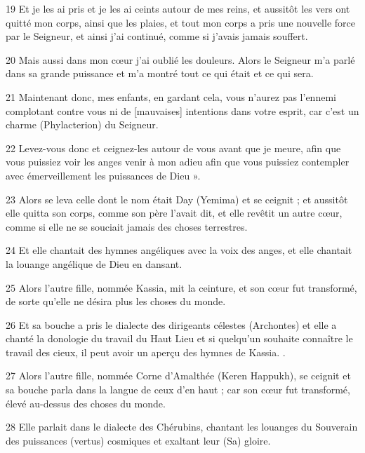 \par 19 Et je les ai pris et je les ai ceints autour de mes reins, et aussitôt les vers ont quitté mon corps, ainsi que les plaies, et tout mon corps a pris une nouvelle force par le Seigneur, et ainsi j'ai continué, comme si j'avais jamais souffert.

\par 20 Mais aussi dans mon cœur j'ai oublié les douleurs. Alors le Seigneur m'a parlé dans sa grande puissance et m'a montré tout ce qui était et ce qui sera.

\par 21 Maintenant donc, mes enfants, en gardant cela, vous n'aurez pas l'ennemi complotant contre vous ni de [mauvaises] intentions dans votre esprit, car c'est un charme (Phylacterion) du Seigneur.

\par 22 Levez-vous donc et ceignez-les autour de vous avant que je meure, afin que vous puissiez voir les anges venir à mon adieu afin que vous puissiez contempler avec émerveillement les puissances de Dieu ».

\par 23 Alors se leva celle dont le nom était Day (Yemima) et se ceignit ; et aussitôt elle quitta son corps, comme son père l'avait dit, et elle revêtit un autre cœur, comme si elle ne se souciait jamais des choses terrestres.

\par 24 Et elle chantait des hymnes angéliques avec la voix des anges, et elle chantait la louange angélique de Dieu en dansant.

\par 25 Alors l'autre fille, nommée Kassia, mit la ceinture, et son cœur fut transformé, de sorte qu'elle ne désira plus les choses du monde.

\par 26 Et sa bouche a pris le dialecte des dirigeants célestes (Archontes) et elle a chanté la donologie du travail du Haut Lieu et si quelqu'un souhaite connaître le travail des cieux, il peut avoir un aperçu des hymnes de Kassia. .

\par 27 Alors l'autre fille, nommée Corne d'Amalthée (Keren Happukh), se ceignit et sa bouche parla dans la langue de ceux d'en haut ; car son cœur fut transformé, élevé au-dessus des choses du monde.

\par 28 Elle parlait dans le dialecte des Chérubins, chantant les louanges du Souverain des puissances (vertus) cosmiques et exaltant leur (Sa) gloire.

